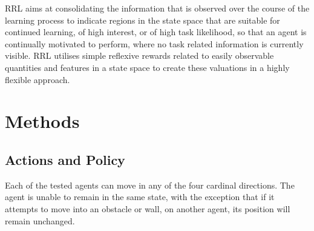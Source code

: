 \documentclass{article}
\begin{document}



RRL aims at consolidating the information that is observed over the course of the learning process to indicate regions in the state space that are suitable for continued learning, of high interest, or of high task likelihood, so that an agent is continually motivated to perform, where no task related information is currently visible.
RRL utilises simple reflexive rewards related to easily observable quantities and features in a state space to create these valuations in a highly flexible approach.

\section{Methods\label{Methods}}
\subsection{Actions and Policy\label{Actions_etc}}

Each of the tested agents can move in any of the four cardinal directions. The agent is unable to remain in the same state, with the exception that if it attempts to move into an obstacle or wall, on another agent, its position will remain unchanged. %
\end{document}
